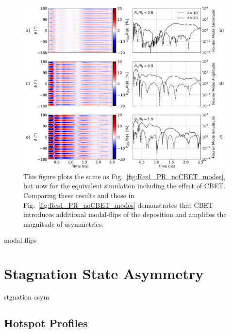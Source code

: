 \begin{figure}[t!]
    \includegraphics[width=\linewidth]{Results1/Images/CBET_PR_modes.png}
    \centering
    \caption{This figure plots the same as Fig.~\ref{fig:Res1_PR_noCBET_modes}, but now for the equivalent simulation including the effect of \ac{CBET}.
    Comparing these results and those in Fig.~\ref{fig:Res1_PR_noCBET_modes} demonstrates that \ac{CBET} introduces additional modal-flips of the deposition and amplifies the magnitude of asymmetries.}%
    \label{fig:Res1_PR_CBET_modes}
\end{figure}

modal flips


\section{Stagnation State Asymmetry}%
\label{sec:Res1_StagnationAsymm}

stgnation asym

\subsection{Hotspot Profiles}%
\label{sec:Res1_HS_profiles}

